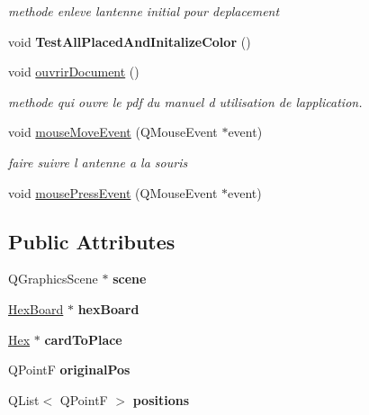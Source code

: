 \begin{DoxyCompactItemize}
\begin{DoxyCompactList}\small\item\em methode enleve l\textquotesingle{}antenne initial pour deplacement \end{DoxyCompactList}\item 
\mbox{\label{class_game_aed930aa8228e574019666854d9bd3496}} 
void {\bfseries Test\+All\+Placed\+And\+Initalize\+Color} ()
\item 
void \mbox{\hyperlink{class_game_a2891d0920da38ccdc2df9a4b441ba084}{ouvrir\+Document}} ()
\begin{DoxyCompactList}\small\item\em methode qui ouvre le pdf du manuel d utilisation de l\textquotesingle{}application. \end{DoxyCompactList}\item 
void \mbox{\hyperlink{class_game_ad761e49ff42758930e76b477d08ba068}{mouse\+Move\+Event}} (Q\+Mouse\+Event $\ast$event)
\begin{DoxyCompactList}\small\item\em faire suivre l antenne a la souris \end{DoxyCompactList}\item 
void \mbox{\hyperlink{class_game_a704ba119948eebd1b6dfc547de967796}{mouse\+Press\+Event}} (Q\+Mouse\+Event $\ast$event)
\end{DoxyCompactItemize}
\subsection*{Public Attributes}
\begin{DoxyCompactItemize}
\item 
\mbox{\label{class_game_a8119e3b9a632906c6808fa294b46a92a}} 
Q\+Graphics\+Scene $\ast$ {\bfseries scene}
\item 
\mbox{\label{class_game_a1e54f6d5ddf84cf70c35af3e19bc3aff}} 
\mbox{\hyperlink{class_hex_board}{Hex\+Board}} $\ast$ {\bfseries hex\+Board}
\item 
\mbox{\label{class_game_a809e4b905deff394ee22ed9b40c6530e}} 
\mbox{\hyperlink{class_hex}{Hex}} $\ast$ {\bfseries card\+To\+Place}
\item 
\mbox{\label{class_game_a5a2f49ceff36b9223e1b93c52e72ca88}} 
Q\+PointF {\bfseries original\+Pos}
\item 
\mbox{\label{class_game_abc41cd5b297f28d0fbf9ea6fb42457f0}} 
Q\+List$<$ Q\+PointF $>$ {\bfseries positions}
\end{DoxyCompactItemize}


